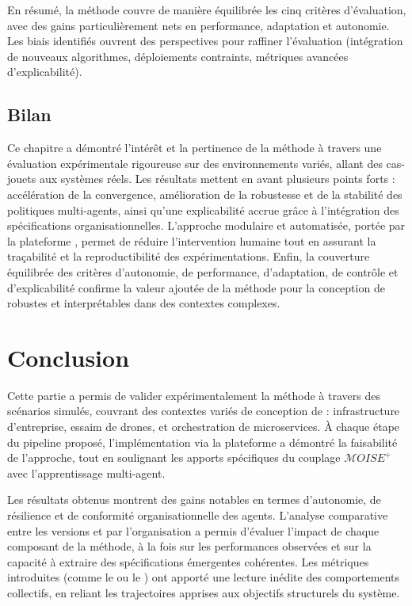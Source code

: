 \medskip
En résumé, la méthode  couvre de manière équilibrée les cinq critères d'évaluation, avec des gains particulièrement nets en performance, adaptation et autonomie. Les biais identifiés ouvrent des perspectives pour raffiner l'évaluation (intégration de nouveaux algorithmes, déploiements contraints, métriques avancées d'explicabilité).

\section{Bilan}

Ce chapitre a démontré l'intérêt et la pertinence de la méthode  à travers une évaluation expérimentale rigoureuse sur des environnements variés, allant des cas-jouets aux systèmes réels. Les résultats mettent en avant plusieurs points forts : accélération de la convergence, amélioration de la robustesse et de la stabilité des politiques multi-agents, ainsi qu'une explicabilité accrue grâce à l'intégration des spécifications organisationnelles. L'approche modulaire et automatisée, portée par la plateforme , permet de réduire l'intervention humaine tout en assurant la traçabilité et la reproductibilité des expérimentations. Enfin, la couverture équilibrée des critères d'autonomie, de performance, d'adaptation, de contrôle et d'explicabilité confirme la valeur ajoutée de la méthode pour la conception de  robustes et interprétables dans des contextes complexes.

\clearpage
\thispagestyle{empty}
\null
\newpage


\chapter*{Conclusion}

Cette partie a permis de valider expérimentalement la méthode  à travers des scénarios simulés, couvrant des contextes variés de conception de  : infrastructure d'entreprise, essaim de drones, et orchestration de microservices. À chaque étape du pipeline proposé, l'implémentation via la plateforme  a démontré la faisabilité de l'approche, tout en soulignant les apports spécifiques du couplage $\mathcal{M}OISE^+$ avec l'apprentissage multi-agent.

Les résultats obtenus montrent des gains notables en termes d'autonomie, de résilience et de conformité organisationnelle des agents. L'analyse comparative entre les versions  et  par l'organisation a permis d'évaluer l'impact de chaque composant de la méthode, à la fois sur les performances observées et sur la capacité à extraire des spécifications émergentes cohérentes. Les métriques introduites (comme le  ou le ) ont apporté une lecture inédite des comportements collectifs, en reliant les trajectoires apprises aux objectifs structurels du système.

